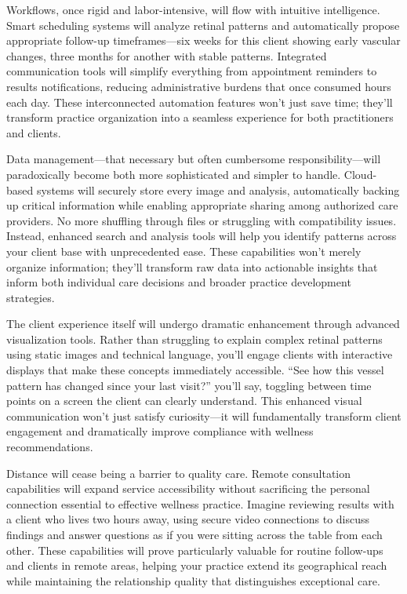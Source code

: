 \documentclass[
  Letterpaper,
]{scrbook}
\begin{document}
Workflows, once rigid and labor-intensive, will flow with intuitive
intelligence. Smart scheduling systems will analyze retinal patterns and
automatically propose appropriate follow-up timeframes---six weeks for
this client showing early vascular changes, three months for another
with stable patterns. Integrated communication tools will simplify
everything from appointment reminders to results notifications, reducing
administrative burdens that once consumed hours each day. These
interconnected automation features won't just save time; they'll
transform practice organization into a seamless experience for both
practitioners and clients.

Data management---that necessary but often cumbersome
responsibility---will paradoxically become both more sophisticated and
simpler to handle. Cloud-based systems will securely store every image
and analysis, automatically backing up critical information while
enabling appropriate sharing among authorized care providers. No more
shuffling through files or struggling with compatibility issues.
Instead, enhanced search and analysis tools will help you identify
patterns across your client base with unprecedented ease. These
capabilities won't merely organize information; they'll transform raw
data into actionable insights that inform both individual care decisions
and broader practice development strategies.

The client experience itself will undergo dramatic enhancement through
advanced visualization tools. Rather than struggling to explain complex
retinal patterns using static images and technical language, you'll
engage clients with interactive displays that make these concepts
immediately accessible. ``See how this vessel pattern has changed since
your last visit?'' you'll say, toggling between time points on a screen
the client can clearly understand. This enhanced visual communication
won't just satisfy curiosity---it will fundamentally transform client
engagement and dramatically improve compliance with wellness
recommendations.

Distance will cease being a barrier to quality care. Remote consultation
capabilities will expand service accessibility without sacrificing the
personal connection essential to effective wellness practice. Imagine
reviewing results with a client who lives two hours away, using secure
video connections to discuss findings and answer questions as if you
were sitting across the table from each other. These capabilities will
prove particularly valuable for routine follow-ups and clients in remote
areas, helping your practice extend its geographical reach while
maintaining the relationship quality that distinguishes exceptional
care.
\end{document}
